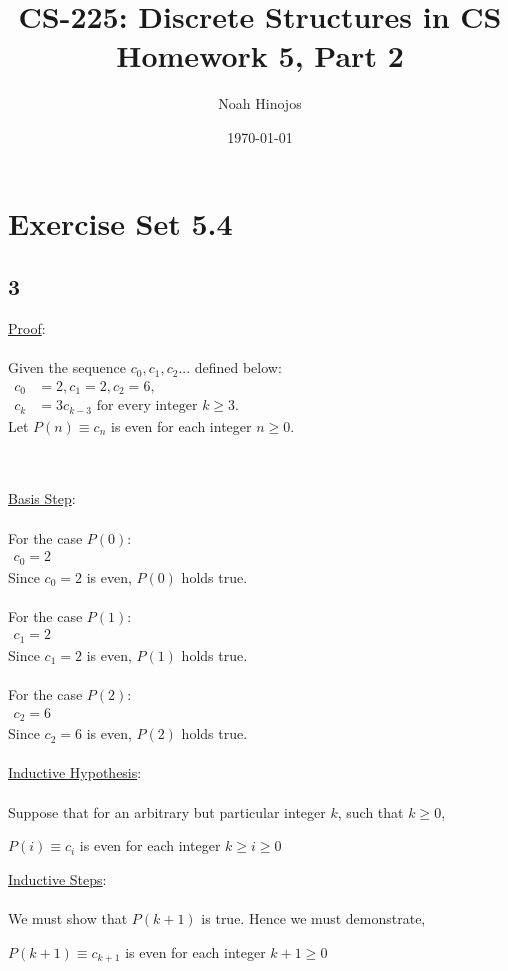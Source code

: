 \documentclass[12pt]{article}
\title{
  \textbf{CS-225: Discrete Structures in CS} \\
  Homework 5, Part 2
  }
\author{Noah Hinojos}
\date{\today}
\newcommand{\xproof}[1]{
    \underline{Proof}:
    \\ \\
    #1
    \\ \\
}
\newcommand{\xbasisstep}{
    \underline{Basis Step}:
    \\ \\
}
\newcommand{\xinductivehypothesis}{
    \underline{Inductive Hypothesis}:
    \\ \\
}
\newcommand{\xinductivestep}{
    \underline{Inductive Steps}:
    \\ \\
}
\begin{document}
\maketitle


\section*{Exercise Set 5.4}
\subsection*{3}
\xproof{
    Given the sequence $c_0, c_1, c_2$... defined below:
    \begin{align*}
        c_0 &= 2, c_1 = 2, c_2 = 6, \hspace{8cm}\\
        c_k &= 3c_{k-3}\text{ for every integer } k \geq 3. \hspace{8cm}
    \end{align*}
    Let $P(n) \equiv c_n$ is even for each integer $n \geq 0$.
}
\xbasisstep
For the case $P(0)$:
\begin{align*}
    c_0 = 2 \hspace{14cm}
\end{align*}
Since $c_0 = 2$ is even, $P(0)$ holds true.
\\ \\
For the case $P(1)$:
\begin{align*}
    c_1 = 2 \hspace{14cm}
\end{align*}
Since $c_1 = 2$ is even, $P(1)$ holds true.
\\ \\
For the case $P(2)$:
\begin{align*}
    c_2 = 6 \hspace{14cm}
\end{align*}
Since $c_2 = 6$ is even, $P(2)$ holds true.
\\ \\
\xinductivehypothesis
Suppose that for an arbitrary but particular integer $k$, such that $k \geq 0$,
\begin{center}
    $P(i) \equiv c_i$ is even for each integer $k \geq i \geq 0$
\end{center}
\xinductivestep
We must show that $P(k+1)$ is true. Hence we must demonstrate,
\begin{center}
    $P(k+1) \equiv c_{k+1}$ is even for each integer $k + 1 \geq 0$
\end{center}
\end{document}
